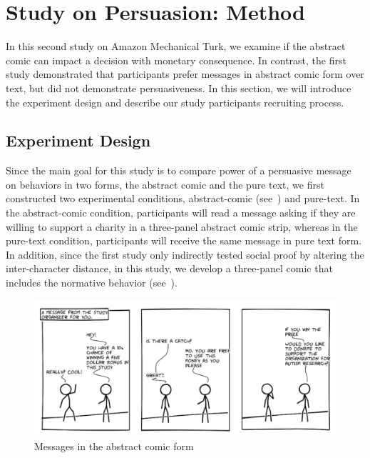 \section{Study on Persuasion: Method}
\label{sec:Method2}

In this second study on Amazon Mechanical Turk, we examine if the abstract comic can impact a decision with monetary consequence. In contrast, the first study demonstrated that participants prefer messages in abstract comic form over text, but did not demonstrate persuasiveness.
In this section, we will introduce the experiment design and describe our study participants recruiting process.




\subsection{Experiment Design}
Since the main goal for this study is to compare power of a persuasive message on behaviors in two forms, the abstract comic and the pure text, we first constructed two experimental conditions, abstract-comic (see~) and pure-text. In the abstract-comic condition, participants will read a message asking if they are willing to support a charity in a three-panel abstract comic strip, whereas in the pure-text condition, participants will receive the same message in pure text form. In addition, since the first study only indirectly tested social proof by altering the inter-character distance, in this study, we develop a three-panel comic that includes the normative behavior (see~).


\begin{figure}[bt]
	\centering
	\includegraphics[width=\columnwidth]{./figures/abstract_comic.png}
	\caption{Messages in the abstract comic form}
	\label{fig:basic three comic panel}
\end{figure}


